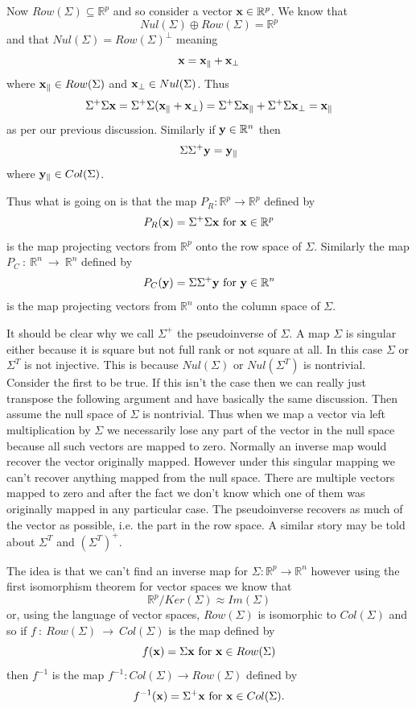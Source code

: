 \documentclass{book}
\begin{document}
Now $Row(\Sigma)\subseteq \mathbb{R}^p$ and so consider a vector ${\bf x} \in \mathbb{R}^p$. We know that
$$
Nul(\Sigma)\oplus Row(\Sigma)=\mathbb{R}^p
$$
and that $Nul(\Sigma)=Row(\Sigma)^\perp$ meaning
$$
{\bf x}={\bf x_\parallel}+{\bf x_\perp}
$$
where ${\bf x_\parallel} \in Row(\Sigma)$ and ${\bf x_\perp} \in Nul(\Sigma)$. Thus
$$
\Sigma^+\Sigma{\bf x}=\Sigma^+\Sigma({\bf x_\parallel}+{\bf x_\perp})=\Sigma^+\Sigma{\bf x_\parallel}+\Sigma^+\Sigma{\bf x_\perp}={\bf x_\parallel}
$$
as per our previous discussion. Similarly if ${\bf y}\in \mathbb{R}^n$ then 
$$
\Sigma\Sigma^+{\bf y}={\bf y_\parallel}
$$
where ${\bf y_\parallel}\in Col(\Sigma)$. 

Thus what is going on is that the map $P_R:\mathbb{R}^p\rightarrow \mathbb{R}^p$ defined by
$$
P_R({\bf x})=\Sigma^+\Sigma{\bf x}\text { for }{\bf x}\in\mathbb{R}^p
$$
is the map projecting vectors from $\mathbb{R}^p$ onto the row space of $\Sigma$. Similarly the map $P_C~:~\mathbb{R}^n~\rightarrow~\mathbb{R}^n$ defined by
$$
P_C({\bf y})=\Sigma\Sigma^+{\bf y}\text { for }{\bf y}\in\mathbb{R}^n
$$
is the map projecting vectors from $\mathbb{R}^n$ onto the column space of $\Sigma$. 


It should be clear why we call $\Sigma^+$ the pseudoinverse of $\Sigma$. A map $\Sigma$ is singular either because it is square but not full rank or not square at all. In this case $\Sigma$ or $\Sigma^T$ is not injective. This is because $Nul(\Sigma)$ or $Nul(\Sigma^T)$ is nontrivial. Consider the first to be true. If this isn't the case then we can really just transpose the following argument and have basically the same discussion. Then assume the null space of $\Sigma$ is nontrivial. Thus when we map a vector via left multiplication by $\Sigma$ we necessarily lose any part of the vector in the null space because all such vectors are mapped to zero. Normally an inverse map would recover the vector originally mapped. However under this singular mapping we can't recover anything mapped from the null space. There are multiple vectors mapped to zero and after the fact we don't know which one of them was originally mapped in any particular case. The pseudoinverse recovers as much of the vector as possible, i.e. the part in the row space. A similar story may be told about $\Sigma^T$ and $(\Sigma^T)^+$. 

The idea is that we can't find an inverse map for $\Sigma:\mathbb{R}^p\rightarrow\mathbb{R}^n$ however using the first isomorphism theorem for vector spaces we know that
$$
\mathbb{R}^p/Ker(\Sigma)\approx Im(\Sigma)
$$
or, using the language of vector spaces, $Row(\Sigma)$ is isomorphic to $Col(\Sigma)$ and so if $f~:~Row(\Sigma)~\rightarrow~Col(\Sigma)$ is the map defined by
$$
f({\bf x})=\Sigma{\bf x}\text{ for }{\bf x}\in Row(\Sigma)
$$
then $f^{-1}$ is the map $f^{-1}:Col(\Sigma)\rightarrow Row(\Sigma)$ defined by
$$
f^{-1}({\bf x})=\Sigma^+{\bf x}\text{ for }{\bf x}\in Col(\Sigma).
$$
\end{document}
